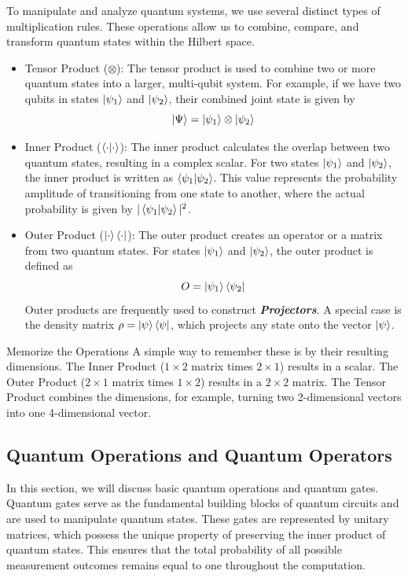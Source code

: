 \documentclass[11pt, letterpaper]{article}
\begin{document}
To manipulate and analyze quantum systems, we use several distinct types of multiplication rules. These operations allow us to combine, compare, and transform quantum states within the Hilbert space.
\begin{itemize}
  \item Tensor Product ($\otimes$): The tensor product is used to combine two or more quantum states into a larger, multi-qubit system. For example, if we have two qubits in states $\ket{\psi_1}$ and $\ket{\psi_2}$, their combined joint state is given by
  \begin{equation}
    \ket{\Psi} = \ket{\psi_1} \otimes \ket{\psi_2}
  \end{equation}
  \item Inner Product ($\braket{\cdot|\cdot}$): The inner product calculates the overlap between two quantum states, resulting in a complex scalar. For two states $\ket{\psi_1}$ and $\ket{\psi_2}$, the inner product is written as $\braket{\psi_1|\psi_2}$. This value represents the probability amplitude of transitioning from one state to another, where the actual probability is given by $|\braket{\psi_1|\psi_2}|^2$.
  \item Outer Product ($\ket{\cdot}\bra{\cdot}$): The outer product creates an operator or a matrix from two quantum states. For states $\ket{\psi_1}$ and $\ket{\psi_2}$, the outer product is defined as
  \begin{equation}
    O = \ket{\psi_1}\bra{\psi_2}
  \end{equation}
  Outer products are frequently used to construct \textbf{\textit{Projectors}}. A special case is the density matrix $\rho = \ket{\psi}\bra{\psi}$, which projects any state onto the vector $\ket{\psi}$.
\end{itemize}

\begin{SBUBox}{Memorize the Operations}
A simple way to remember these is by their resulting dimensions. The Inner Product ($1 \times 2$ matrix times $2 \times 1$) results in a scalar. The Outer Product ($2 \times 1$ matrix times $1 \times 2$) results in a $2 \times 2$ matrix. The Tensor Product combines the dimensions, for example, turning two 2-dimensional vectors into one 4-dimensional vector.
\end{SBUBox}


\subsection{Quantum Operations and Quantum Operators}
In this section, we will discuss basic quantum operations and quantum gates. Quantum gates serve as the fundamental building blocks of quantum circuits and are used to manipulate quantum states. These gates are represented by unitary matrices, which possess the unique property of preserving the inner product of quantum states. This ensures that the total probability of all possible measurement outcomes remains equal to one throughout the computation.
\end{document}
